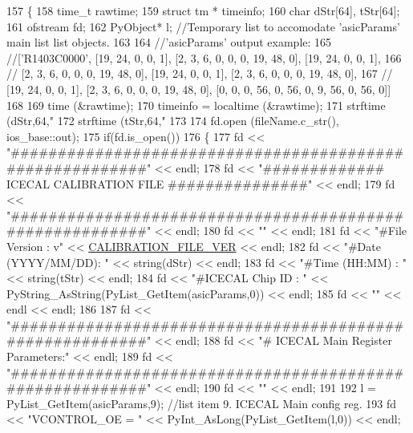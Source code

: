 \begin{DoxyCode}
157 \{
158   time\_t rawtime;
159   \textcolor{keyword}{struct }tm * timeinfo;
160     \textcolor{keywordtype}{char} dStr[64], tStr[64];
161     ofstream fd;
162     PyObject* l;        \textcolor{comment}{//Temporary list to accomodate 'asicParams' main list list objects.}
163 
164     \textcolor{comment}{//'asicParams' output example:}
165     \textcolor{comment}{//['R1403C0000', [19, 24, 0, 0, 1], [2, 3, 6, 0, 0, 0, 19, 48, 0], [19, 24, 0, 0, 1],}
166     \textcolor{comment}{// [2, 3, 6, 0, 0, 0, 19, 48, 0], [19, 24, 0, 0, 1], [2, 3, 6, 0, 0, 0, 19, 48, 0], }
167     \textcolor{comment}{// [19, 24, 0, 0, 1], [2, 3, 6, 0, 0, 0, 19, 48, 0], [0, 0, 0, 56, 0, 56, 0, 9, 56, 0, 56, 0]]}
168 
169   time (&rawtime);
170   timeinfo = localtime (&rawtime);
171     strftime (dStr,64,\textcolor{stringliteral}{"%
172     strftime (tStr,64,\textcolor{stringliteral}{"%
173 
174     fd.open (fileName.c\_str(), ios\_base::out);
175     \textcolor{keywordflow}{if}(fd.is\_open())
176     \{
177         fd << \textcolor{stringliteral}{"#########################################################"} << endl;
178         fd << \textcolor{stringliteral}{"#############   ICECAL CALIBRATION FILE   ###############"} << endl;
179         fd << \textcolor{stringliteral}{"#########################################################"} << endl;
180         fd << \textcolor{stringliteral}{""} << endl;
181         fd << \textcolor{stringliteral}{"#File Version     : v"} << \hyperlink{ICECALv3_8h_ab10444bd2aa43310cf654abe4e4a7af6}{CALIBRATION\_FILE\_VER} << endl;
182         fd << \textcolor{stringliteral}{"#Date (YYYY/MM/DD): "} << string(dStr) << endl;
183         fd << \textcolor{stringliteral}{"#Time (HH:MM)     : "} << string(tStr) << endl;
184         fd << \textcolor{stringliteral}{"#ICECAL Chip ID   : "} << PyString\_AsString(PyList\_GetItem(asicParams,0)) << endl;
185         fd << \textcolor{stringliteral}{""} << endl << endl;
186     
187         fd << \textcolor{stringliteral}{"#########################################################"} << endl;
188         fd << \textcolor{stringliteral}{"# ICECAL Main Register Parameters:"} << endl;
189         fd << \textcolor{stringliteral}{"#########################################################"} << endl;
190         fd << \textcolor{stringliteral}{""} << endl;
191 
192         l = PyList\_GetItem(asicParams,9);       \textcolor{comment}{//list item 9. ICECAL Main config reg.}
193         fd <<   \textcolor{stringliteral}{"VCONTROL\_OE = "} << PyInt\_AsLong(PyList\_GetItem(l,0)) << endl;
}}
\end{DoxyCode}
